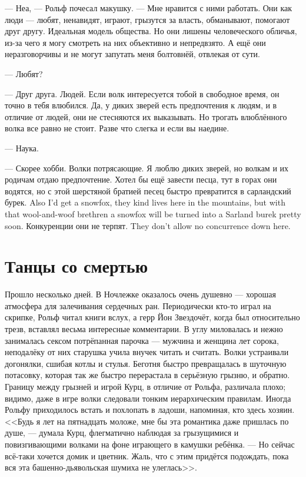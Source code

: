 --- Неа, --- Рольф почесал макушку.
--- Мне нравится с ними работать.
Они как люди --- любят, ненавидят, играют, грызутся за власть, обманывают, помогают друг другу.
Идеальная модель общества.
Но они лишены человеческого обличья, из-за чего я могу смотреть на них объективно и непредвзято.
А ещё они неразговорчивы и не могут запутать меня болтовнёй, отвлекая от сути.

--- Любят?

--- Друг друга.
Людей.
Если волк интересуется тобой в свободное время, он точно в тебя влюбился.
Да, у диких зверей есть предпочтения к людям, и в отличие от людей, они не стесняются их выказывать.
Но трогать влюблённого волка все равно не стоит.
Разве что слегка и если вы наедине.

--- Наука.

--- Скорее хобби.
Волки потрясающие.
Я люблю диких зверей, но волкам и их родичам отдаю предпочтение.
{Хотел бы ещё завести песца, тут в горах они водятся, но с этой шерстяной братией песец быстро превратится в сарландский бурек.}
{Also I'd get a snowfox, they kind lives here in the mountains, but with that wool-and-woof brethren a snowfox will be turned into a Sarland burek pretty soon.}
{Конкуренции они не терпят.}
{They don't allow no concurrence down here.}

\section{Танцы со смертью}

Прошло несколько дней.
В Ночлежке оказалось очень душевно --- хорошая атмосфера для залечивания сердечных ран.
Периодически кто-то играл на скрипке, Рольф читал книги вслух, а герр Йон Звездочёт, когда был относительно трезв, вставлял весьма интересные комментарии.
В углу миловалась и нежно занималась сексом потрёпанная парочка --- мужчина и женщина лет сорока, неподалёку от них старушка учила внучек читать и считать.
Волки устраивали догонялки, сшибая котлы и стулья.
Беготня быстро превращалась в шуточную потасовку, которая так же быстро перерастала в серьёзную грызню, и обратно.
Границу между грызней и игрой Курц, в отличие от Рольфа, различала плохо;
видимо, даже в игре волки следовали тонким иерархическим правилам.
Иногда Рольфу приходилось встать и похлопать в ладоши, напоминая, кто здесь хозяин.
<<Будь я лет на пятнадцать моложе, мне бы эта романтика даже пришлась по душе, --- думала Курц, флегматично наблюдая за грызущимися и повизгивающими волками на фоне играющего в камушки ребёнка.
--- Но сейчас всё-таки хочется домик и цветник.
Жаль, что с этим придётся подождать, пока вся эта башенно-дьявольская шумиха не улеглась>>.

